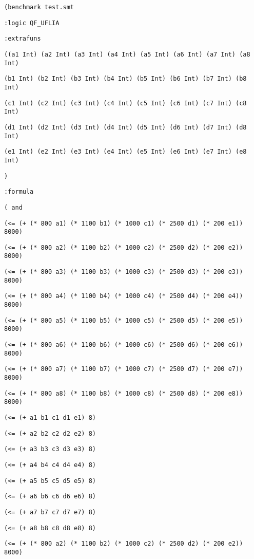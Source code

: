 \documentclass[12pt]{article}
\begin{document}
 {\footnotesize

{\tt  (benchmark test.smt }

{\tt  :logic QF\_UFLIA }

{\tt  :extrafuns }

{\tt  ((a1 Int) (a2 Int) (a3 Int) (a4 Int) (a5 Int) (a6 Int) (a7 Int) (a8 Int) }

{\tt  (b1 Int) (b2 Int) (b3 Int) (b4 Int) (b5 Int) (b6 Int) (b7 Int) (b8 Int) }

{\tt  (c1 Int) (c2 Int) (c3 Int) (c4 Int) (c5 Int) (c6 Int) (c7 Int) (c8 Int) }

{\tt  (d1 Int) (d2 Int) (d3 Int) (d4 Int) (d5 Int) (d6 Int) (d7 Int) (d8 Int) }

{\tt  (e1 Int) (e2 Int) (e3 Int) (e4 Int) (e5 Int) (e6 Int) (e7 Int) (e8 Int) }

{\tt  ) }

{\tt  :formula }

{\tt  ( and  }

{\tt  (<= (+ (* 800 a1) (* 1100 b1) (* 1000 c1) (* 2500 d1) (* 200 e1)) 8000) }

{\tt  (<= (+ (* 800 a2) (* 1100 b2) (* 1000 c2) (* 2500 d2) (* 200 e2)) 8000) }

{\tt  (<= (+ (* 800 a3) (* 1100 b3) (* 1000 c3) (* 2500 d3) (* 200 e3)) 8000) }

{\tt  (<= (+ (* 800 a4) (* 1100 b4) (* 1000 c4) (* 2500 d4) (* 200 e4)) 8000) }

{\tt  (<= (+ (* 800 a5) (* 1100 b5) (* 1000 c5) (* 2500 d5) (* 200 e5)) 8000) }

{\tt  (<= (+ (* 800 a6) (* 1100 b6) (* 1000 c6) (* 2500 d6) (* 200 e6)) 8000) }

{\tt  (<= (+ (* 800 a7) (* 1100 b7) (* 1000 c7) (* 2500 d7) (* 200 e7)) 8000) }

{\tt  (<= (+ (* 800 a8) (* 1100 b8) (* 1000 c8) (* 2500 d8) (* 200 e8)) 8000) }

{\tt  (<= (+ a1 b1 c1 d1 e1) 8) }

{\tt  (<= (+ a2 b2 c2 d2 e2) 8) }

{\tt  (<= (+ a3 b3 c3 d3 e3) 8) }

{\tt  (<= (+ a4 b4 c4 d4 e4) 8) }

{\tt  (<= (+ a5 b5 c5 d5 e5) 8) }

{\tt  (<= (+ a6 b6 c6 d6 e6) 8) }

{\tt  (<= (+ a7 b7 c7 d7 e7) 8) }

{\tt  (<= (+ a8 b8 c8 d8 e8) 8) }

{\tt  (<= (+ (* 800 a2) (* 1100 b2) (* 1000 c2) (* 2500 d2) (* 200 e2)) 8000) }

}
\end{document}
